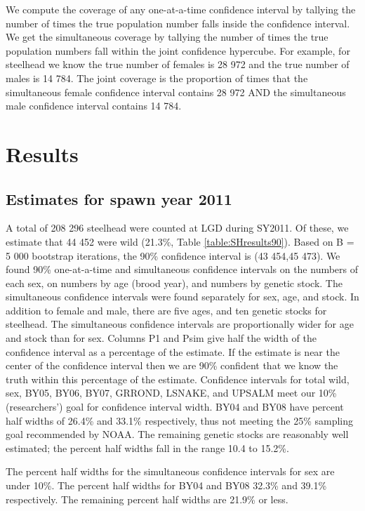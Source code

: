 \documentclass[%
                leqno,         %
%
]{nrc1}                          %
\begin{document}
We compute the coverage of any one-at-a-time confidence interval by tallying the number of times the true population number falls inside the confidence interval. We get the simultaneous coverage by tallying the number of times the true population numbers fall within the joint confidence hypercube. For example, for steelhead we know the true number of females is 28 972 and the true number of males is 14 784. The joint coverage is the proportion of times that the simultaneous female confidence interval contains 28 972 AND the simultaneous male confidence interval contains 14 784.

\section*{Results}
\label{sec:results}
\subsection*{Estimates for spawn year 2011}
A total of 208 296 steelhead were counted at LGD during SY2011. Of these, we estimate that 44 452 were wild (21.3\%, Table \ref{table:SHresults90}).  Based on B = 5 000 bootstrap iterations, the 90\% confidence interval is (43 454,45 473). We found 90\% one-at-a-time and simultaneous confidence intervals on the numbers of each sex, on numbers by age (brood year), and numbers by genetic stock. The simultaneous confidence intervals were found separately for sex, age, and stock. In addition to female and male, there are five ages, and ten genetic stocks for steelhead. The simultaneous confidence intervals are proportionally wider for age and stock than for sex. Columns P1 and Psim give half the width of the confidence interval as a percentage of the estimate. If the estimate is near the center of the confidence interval then we are 90\% confident that we know the truth within this percentage of the estimate. Confidence intervals for total wild, sex, BY05, BY06, BY07, GRROND, LSNAKE, and UPSALM meet our 10\% (researchers') goal for confidence interval width. BY04 and BY08 have percent half widths of 26.4\% and 33.1\% respectively, thus not meeting the 25\% sampling goal recommended by NOAA. The remaining genetic stocks are reasonably well estimated; the percent half widths fall in the range 10.4 to 15.2\%.

The percent half widths for the simultaneous confidence intervals for sex are under 10\%.  The percent half widths for BY04 and BY08 32.3\% and 39.1\% respectively. The remaining percent half widths are 21.9\% or less.
\end{document}
